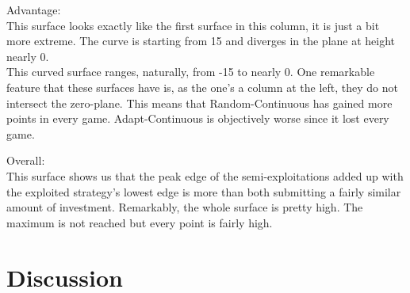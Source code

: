 \documentclass{article}
\begin{document}
\begin{itemize}
		Advantage:\\
			This surface looks exactly like the first surface in this column, it is just a bit more extreme.
			The curve is starting from 15 and diverges in the plane at height nearly 0.\\
			This curved surface ranges, naturally, from -15 to nearly 0.
			One remarkable feature that these surfaces have is, as the one's a column at the left, they do not intersect the zero-plane.
			This means that Random-Continuous has gained more points in every game.
			Adapt-Continuous is objectively worse since it lost every game.

		Overall:\\
			This surface shows us that the peak edge of the semi-exploitations added up with the exploited strategy's lowest edge is more than both submitting a fairly similar amount of investment.
			Remarkably, the whole surface is pretty high.
			The maximum is not reached but every point is fairly high.
			
		 	
		 	
\end{itemize}

\section{Discussion}
\end{document}
